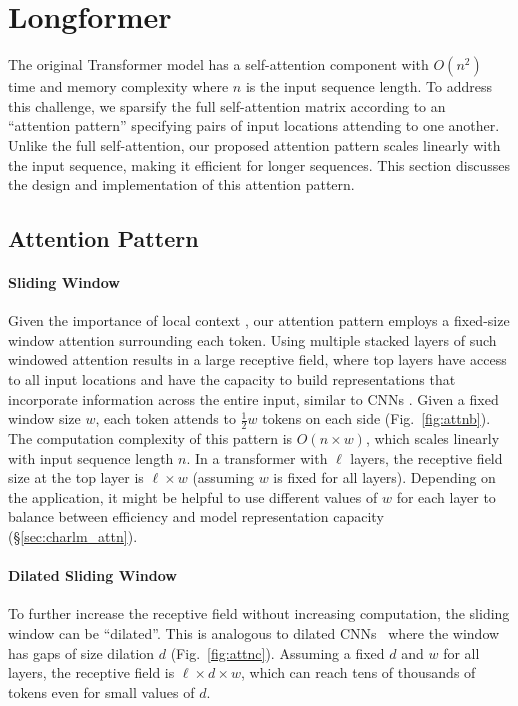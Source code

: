 \documentclass[11pt,a4paper]{article}
\begin{document}
\section{Longformer}
\label{sec:model}

The original Transformer model has a self-attention component with $O(n^2)$ time and memory complexity where $n$ is the input sequence length. 
To address this challenge, we sparsify the full self-attention matrix according to 
an ``attention pattern'' specifying pairs of input locations attending to one another.
Unlike the full self-attention, our proposed attention pattern scales linearly with the input sequence, making it efficient for longer sequences.
This section discusses the design and implementation of this attention pattern. 

\subsection{Attention Pattern}
\label{sec:attn}

\paragraph{Sliding Window}
Given the importance of local context \cite{Kovaleva2019RevealingTD}, our attention pattern employs a fixed-size window attention
surrounding each token.
Using multiple stacked layers of such windowed attention results in a large receptive field, where top layers have access to all input locations and have the capacity to build representations that incorporate information across the entire input, similar to CNNs \cite{Wu2019PayLA}.
Given a fixed window size $w$, each token attends to $\frac{1}{2}w$ tokens on each side (Fig.~\ref{fig:attnb}).
The computation complexity of this pattern is $O(n \times w)$, which scales linearly with input sequence length $n$. 
In a transformer with $\ell$ layers, the receptive field size at the top layer is $\ell \times w$ (assuming $w$ is fixed for all layers).
Depending on the application, it might be helpful to use different values of $w$ for each layer to balance between efficiency and model representation capacity (\S\ref{sec:charlm_attn}).

\paragraph{Dilated Sliding Window}
To further increase the receptive field without increasing computation, the sliding window can be ``dilated''. This is analogous to dilated CNNs~\cite{Oord2016WaveNetAG} where the window has gaps of size dilation $d$ (Fig.~\ref{fig:attnc}).
Assuming a fixed $d$ and $w$ for all layers, the receptive field 
is $\ell \times d \times w$, which can reach tens of thousands
of tokens even for small values of $d$. 
\end{document}

